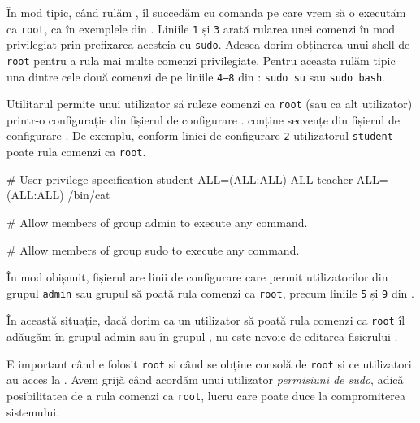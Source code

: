 În mod tipic, când rulăm , îl succedăm cu comanda pe care vrem să o executăm ca \texttt{root}, ca în exemplele din .
Liniile \texttt{1} și \texttt{3} arată rularea unei comenzi în mod privilegiat prin prefixarea acesteia cu \texttt{sudo}.
Adesea dorim obținerea unui shell de \texttt{root} pentru a rula mai multe comenzi privilegiate.
Pentru aceasta rulăm tipic una dintre cele două comenzi de pe liniile \texttt{4--8} din : \texttt{sudo su} sau \texttt{sudo bash}.


Utilitarul  permite unui utilizator să ruleze comenzi ca \texttt{root} (sau ca alt utilizator) printr-o configurație din fișierul de configurare .
 conține secvențe din fișierul de configurare .
De exemplu, conform liniei de configurare \texttt{2} utilizatorul \texttt{student} poate rula comenzi ca \texttt{root}.

\begin{screen}[caption={Secvențe din fișierul /etc/sudoers},label={lst:user:sudoers}]
# User privilege specification
student ALL=(ALL:ALL) ALL
teacher ALL=(ALL:ALL) /bin/cat

# Allow members of group admin to execute any command.

# Allow members of group sudo to execute any command.
\end{screen}

În mod obișnuit, fișierul  are linii de configurare care permit utilizatorilor din grupul \texttt{admin} sau grupul  să poată rula comenzi ca \texttt{root}, precum liniile \texttt{5} și \texttt{9} din .

În această situație, dacă dorim ca un utilizator să poată rula comenzi ca \texttt{root} îl adăugăm în grupul admin sau în grupul , nu este nevoie de editarea fișierului .

\begin{note}
  E important când e folosit \texttt{root} și când se obține consolă de \texttt{root} și ce utilizatori au acces la .
  Avem grijă când acordăm unui utilizator \textit{permisiuni de sudo}, adică posibilitatea de a rula comenzi ca \texttt{root}, lucru care poate duce la compromiterea sistemului.
\end{note}

